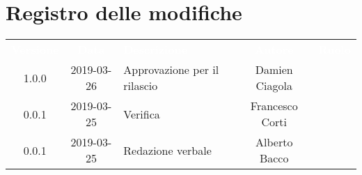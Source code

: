 \section*{Registro delle modifiche}
{
	\renewcommand{\arraystretch}{1.5}
	\centering
	\begin{longtable}{ c c  C{4cm}  c  c }
		
		\textcolor{white}{\textbf{Versione}} & \textcolor{white}{\textbf{Data}} & \textcolor{white}{\textbf{Descrizione}} & \textcolor{white}{\textbf{Autore}} & \textcolor{white}{\textbf{Ruolo}}\\
		1.0.0 & 2019-03-26 & Approvazione per il rilascio & Damien Ciagola & \Res{}\\
		0.0.1 & 2019-03-25 & Verifica & Francesco Corti & \ver{}\\
		0.0.1 & 2019-03-25 & Redazione verbale & Alberto Bacco & \reda{}\\
		
		
	\end{longtable}
	
}